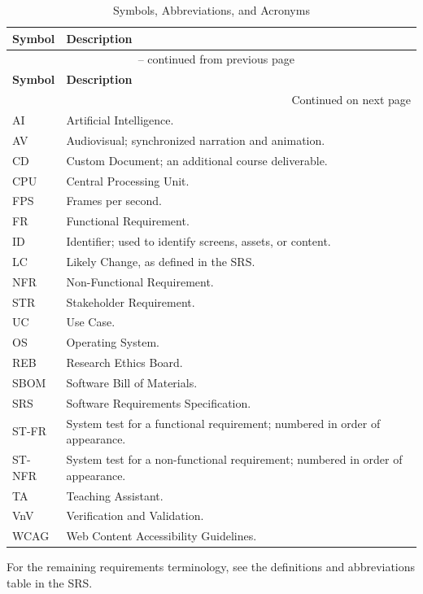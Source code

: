 \documentclass[10pt,titlepage]{article}
\begin{document}
\renewcommand{\arraystretch}{1.2}
\begin{longtable}{@{}p{}p{}@{}}
\caption{Symbols, Abbreviations, and Acronyms}\label{tab:VnVAcronyms}\\
\toprule
\textbf{Symbol} & \textbf{Description}\\
\midrule
\endfirsthead
\multicolumn{2}{c}{\tablename\ \thetable{} -- continued from previous page}\\
\toprule
\textbf{Symbol} & \textbf{Description}\\
\midrule
\endhead
\midrule
\multicolumn{2}{r}{Continued on next page}\\
\endfoot
\bottomrule
\endlastfoot
AI & Artificial Intelligence.\\
AV & Audiovisual; synchronized narration and animation.\\
CD & Custom Document; an additional course deliverable.\\
CPU & Central Processing Unit.\\
FPS & Frames per second.\\
FR & Functional Requirement.\\
ID & Identifier; used to identify screens, assets, or content.\\
LC & Likely Change, as defined in the SRS.\\
NFR & Non-Functional Requirement.\\
STR & Stakeholder Requirement. \\
UC & Use Case. \\
OS & Operating System.\\
REB & Research Ethics Board.\\
SBOM & Software Bill of Materials.\\
SRS & Software Requirements Specification.\\
ST-FR & System test for a functional requirement; numbered in order of appearance.\\
ST-NFR & System test for a non-functional requirement; numbered in order of appearance.\\
TA & Teaching Assistant.\\
VnV & Verification and Validation.\\
WCAG & Web Content Accessibility Guidelines. \\
\end{longtable}

For the remaining requirements terminology, see the definitions and
abbreviations table in the SRS.
\end{document}
